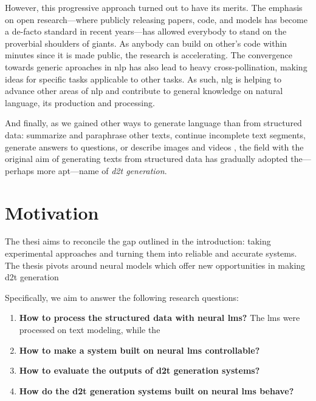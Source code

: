 \documentclass[12pt,notitlepage,a4paper,openright]{report}
\begin{document}
However, this progressive approach turned out to have its merits. The emphasis on open research---where publicly releasing papers, code, and models has become a de-facto standard in recent years---has allowed everybody to stand on the proverbial shoulders of giants. As anybody can build on other's code within minutes since it is made public, the research is accelerating. The convergence towards generic aproaches in \ac{nlp} has also lead to heavy cross-pollination, making ideas for specific tasks applicable to other tasks. As such, \ac{nlg} is helping to advance other areas of \ac{nlp} and contribute to general knowledge on natural language, its production and processing.

And finally, as we gained other ways to generate language than from structured data: summarize and paraphrase other texts, continue incomplete text segments, generate answers to questions, or describe images and videos \cite{Dong2021ASO}, the field with the original aim of generating texts from structured data has gradually adopted the---perhaps more apt---name of \textit{\ac{d2t} generation}.






\section{Motivation}
\label{sec:rq}

The thesi aims to reconcile the gap outlined in the introduction: taking experimental approaches and turning them into reliable and accurate systems. The thesis pivots around neural models which offer new opportunities in making \ac{d2t} generation

Specifically, we aim to answer the following research questions:

\begin{enumerate}
  \item \textbf{How to process the structured data with neural \acp{lm}?} The \acp{lm} were processed on text modeling, while the
  \item \textbf{How to make a system built on neural \acp{lm} controllable?}
  \item \textbf{How to evaluate the outputs of \ac{d2t} generation systems?}
  \item \textbf{How do the \ac{d2t} generation systems built on neural \acp{lm} behave?}
\end{enumerate}
\end{document}
